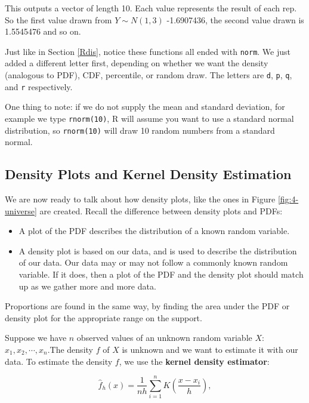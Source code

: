 \documentclass[
]{book}
\providecommand{\tightlist}{%
  \setlength{\itemsep}{0pt}\setlength{\parskip}{0pt}}
\begin{document}
This outputs a vector of length 10. Each value represents the result of each rep. So the first value drawn from \(Y \sim N(1,3)\) -1.6907436, the second value drawn is 1.5545476 and so on.

Just like in Section \ref{Rdis}, notice these functions all ended with \texttt{norm}. We just added a different letter first, depending on whether we want the density (analogous to PDF), CDF, percentile, or random draw. The letters are \texttt{d}, \texttt{p}, \texttt{q}, and \texttt{r} respectively.

One thing to note: if we do not supply the mean and standard deviation, for example we type \texttt{rnorm(10)}, R will assume you want to use a standard normal distribution, so \texttt{rnorm(10)} will draw 10 random numbers from a standard normal.

\subsection{Density Plots and Kernel Density Estimation}\label{KDE}

We are now ready to talk about how density plots, like the ones in Figure \ref{fig:4-universe} are created. Recall the difference between density plots and PDFs:

\begin{itemize}
\tightlist
\item
  A plot of the PDF describes the distribution of a known random variable.
\item
  A density plot is based on our data, and is used to describe the distribution of our data. Our data may or may not follow a commonly known random variable. If it does, then a plot of the PDF and the density plot should match up as we gather more and more data.
\end{itemize}

Proportions are found in the same way, by finding the area under the PDF or density plot for the appropriate range on the support.

Suppose we have \(n\) observed values of an unknown random variable \(X\): \(x_1, x_2, \cdots, x_n\).The density \(f\) of \(X\) is unknown and we want to estimate it with our data. To estimate the density \(f\), we use the \textbf{kernel density estimator}:

\begin{equation} 
\hat{f}_h(x) = \frac{1}{nh} \sum_{i=1}^n K \left( \frac{x-x_i}{h}\right ),
\label{eq:4-KDE}
\end{equation}
\end{document}
